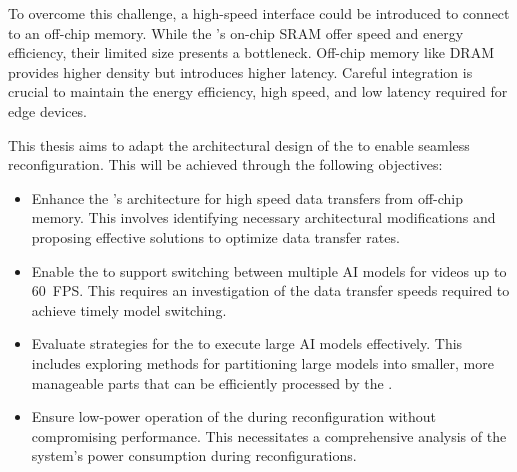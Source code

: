 
To overcome this challenge, a high-speed interface could be introduced to connect to an off-chip memory.
While the \graicore{}'s on-chip SRAM offer speed and energy efficiency, their limited size presents a bottleneck.
Off-chip memory like DRAM provides higher density but introduces higher latency.
Careful integration is crucial to maintain the energy efficiency, high speed, and low latency required for edge devices.

This thesis aims to adapt the architectural design of the \graicore{} to enable seamless reconfiguration.
This will be achieved through the following objectives:
\begin{itemize}
    \item
    Enhance the \graicore{}'s architecture for high speed data transfers from off-chip memory.
    This involves identifying necessary architectural modifications and proposing effective solutions to optimize data transfer rates.
    \item
    Enable the \graicore{} to support switching between multiple AI models for videos up to \SI{60}{FPS}.
    This requires an investigation of the data transfer speeds required to achieve timely model switching.
    \item
    Evaluate strategies for the \graicore{} to execute large AI models effectively.
    This includes exploring methods for partitioning large models into smaller, more manageable parts that can be efficiently processed by the \graicore{}.
    \item
    Ensure low-power operation of the \graicore{} during reconfiguration without compromising performance.
    This necessitates a comprehensive analysis of the system's power consumption during reconfigurations.
\end{itemize}